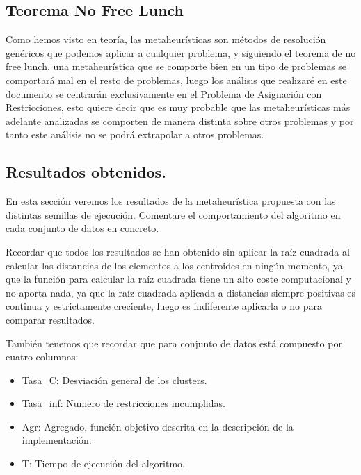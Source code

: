 \documentclass[12pt, spanish]{article}
\begin{document}
\subsection{Teorema No Free Lunch}

Como hemos visto en teoría, las metaheurísticas son métodos de resolución genéricos que podemos aplicar a cualquier problema, y siguiendo el teorema de no free lunch, una metaheurística que se comporte bien en un tipo de problemas se comportará mal en el resto de problemas, luego los análisis que realizaré en este documento se centrarán exclusivamente en el Problema de Asignación con Restricciones, esto quiere decir que es muy probable que las metaheurísticas más adelante analizadas se comporten de manera distinta sobre otros problemas y por tanto este análisis no se podrá extrapolar a otros problemas.

\newpage

\subsection{Resultados obtenidos.}

En esta sección veremos los resultados de la metaheurística propuesta con las distintas semillas de ejecución. Comentare el comportamiento del algoritmo en cada conjunto de datos en concreto.

Recordar que todos los resultados se han obtenido sin aplicar la raíz cuadrada al calcular las distancias de los elementos a los centroides en ningún momento, ya que la función para calcular la raíz cuadrada tiene un alto coste computacional y no aporta nada, ya que la raíz cuadrada aplicada a distancias siempre positivas es continua y estrictamente creciente, luego es indiferente aplicarla o no para comparar resultados.


También tenemos que recordar que para conjunto de datos está compuesto por cuatro columnas:

\begin{itemize}
	\item Tasa\_C: Desviación general de los clusters.
	\item Tasa\_inf: Numero de restricciones incumplidas.
	\item Agr: Agregado, función objetivo descrita en la descripción de la implementación.
	\item T: Tiempo de ejecución del algoritmo.
\end{itemize}
\end{document}
